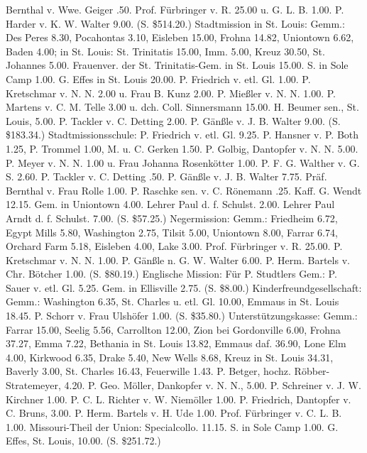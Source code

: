Bernthal v. Wwe. Geiger .50. Prof. Fürbringer v. R. 25.00 u. G. L. B. 1.00. P. Harder v. K. W. Walter 9.00. (S. \$514.20.)
Stadtmission in St. Louis: Gemm.: Des Peres 8.30, Pocahontas 3.10, Eisleben 15.00, Frohna 14.82, Uniontown 6.62, Baden 4.00; in St. Louis: St. Trinitatis 15.00, Imm. 5.00, Kreuz 30.50, St. Johannes 5.00. Frauenver. der St. Trinitatis-Gem. in St. Louis 15.00. S. in Sole Camp 1.00. G. Effes in St. Louis 20.00. P. Friedrich v. etl. Gl. 1.00. P. Kretschmar v. N. N. 2.00 u. Frau B. Kunz 2.00. P. Mießler v. N. N. 1.00. P. Martens v. C. M. Telle 3.00 u. dch. Coll. Sinnersmann 15.00. H. Beumer sen., St. Louis, 5.00. P. Tackler v. C. Detting 2.00. P. Gänßle v. J. B. Walter 9.00. (S. \$183.34.)
Stadtmissionsschule: P. Friedrich v. etl. Gl. 9.25. P. Hansner v. P. Both 1.25, P. Trommel 1.00, M. u. C. Gerken 1.50. P. Golbig, Dantopfer v. N. N. 5.00. P. Meyer v. N. N. 1.00 u. Frau Johanna Rosenkötter 1.00. P. F. G. Walther v. G. S. 2.60. P. Tackler v. C. Detting .50. P. Gänßle v. J. B. Walter 7.75. Präf. Bernthal v. Frau Rolle 1.00. P. Raschke sen. v. C. Rönemann .25. Kaff. G. Wendt 12.15. Gem. in Uniontown 4.00. Lehrer Paul d. f. Schulst. 2.00. Lehrer Paul Arndt d. f. Schulst. 7.00. (S. \$57.25.)
Negermission: Gemm.: Friedheim 6.72, Egypt Mills 5.80, Washing­ton 2.75, Tilsit 5.00, Uniontown 8.00, Farrar 6.74, Orchard Farm 5.18, Eisleben 4.00, Lake 3.00. Prof. Fürbringer v. R. 25.00. P. Kretschmar v. N. N. 1.00. P. Gänßle n. G. W. Walter 6.00. P. Herm. Bartels v. Chr. Bötcher 1.00. (S. \$80.19.)
Englische Mission: Für P. Studtlers Gem.: P. Sauer v. etl. Gl. 5.25. Gem. in Ellisville 2.75. (S. \$8.00.)
Kinderfreundgesellschaft: Gemm.: Washington 6.35, St. Charles u. etl. Gl. 10.00, Emmaus in St. Louis 18.45. P. Schorr v. Frau Ulshöfer 1.00. (S. \$35.80.)
Unterstützungskasse: Gemm.: Farrar 15.00, Seelig 5.56, Carrollton 12.00, Zion bei Gordonville 6.00, Frohna 37.27, Emma 7.22, Bethania in St. Louis 13.82, Emmaus daf. 36.90, Lone Elm 4.00, Kirkwood 6.35, Drake 5.40, New Wells 8.68, Kreuz in St. Louis 34.31, Baverly 3.00, St. Charles 16.43, Feuerwille 1.43. P. Betger, hochz. Röbber-Stratemeyer, 4.20. P. Geo. Möller, Dankopfer v. N. N., 5.00. P. Schreiner v. J. W. Kirchner 1.00. P. C. L. Richter v. W. Niemöller 1.00. P. Friedrich, Dantopfer v. C. Bruns, 3.00. P. Herm. Bartels v. H. Ude 1.00. Prof. Fürbringer v. C. L. B. 1.00. Missouri-Theil der Union: Specialcollo. 11.15. S. in Sole Camp 1.00. G. Effes, St. Louis, 10.00. (S. \$251.72.)
